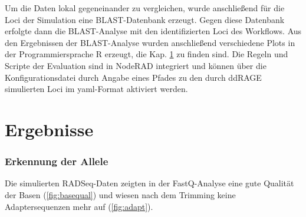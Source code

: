Um die Daten lokal gegeneinander zu vergleichen, wurde anschließend für die Loci der Simulation eine BLAST-Datenbank erzeugt. Gegen diese Datenbank erfolgte dann die BLAST-Analyse mit den identifizierten Loci des Workflows. Aus den Ergebnissen der BLAST-Analyse wurden anschließend verschiedene Plots in der Programmiersprache R erzeugt, die Kap. \ref{sec:res} zu finden sind. Die Regeln und Scripte der Evaluation sind in NodeRAD integriert und können über die Konfigurationsdatei durch Angabe eines Pfades zu den durch ddRAGE simulierten Loci im yaml-Format aktiviert werden.

\section{Ergebnisse} \label{sec:res}
\subsubsection{Erkennung der Allele} \label{subsubsec:res_alleles}

Die simulierten RADSeq-Daten zeigten in der FastQ-Analyse eine gute Qualität der Basen (\autoref{fig:basequal}) und wiesen nach dem Trimming keine Adaptersequenzen mehr auf (\autoref{fig:adapt}).\\

